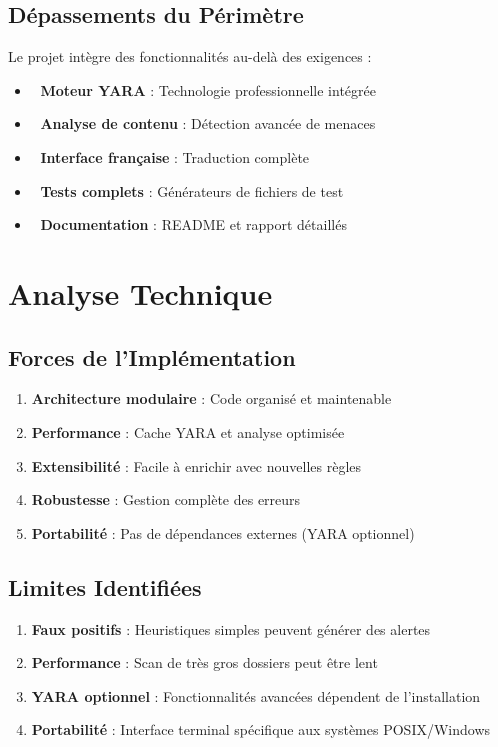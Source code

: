\documentclass[12pt,a4paper]{report}
\begin{document}
\subsection{Dépassements du Périmètre}

Le projet intègre des fonctionnalités au-delà des exigences :

\begin{itemize}
    \item 🌟 \textbf{Moteur YARA} : Technologie professionnelle intégrée
    \item 🌟 \textbf{Analyse de contenu} : Détection avancée de menaces
    \item 🌟 \textbf{Interface française} : Traduction complète
    \item 🌟 \textbf{Tests complets} : Générateurs de fichiers de test
    \item 🌟 \textbf{Documentation} : README et rapport détaillés
\end{itemize}

\section{Analyse Technique}

\subsection{Forces de l'Implémentation}

\begin{enumerate}
    \item \textbf{Architecture modulaire} : Code organisé et maintenable
    \item \textbf{Performance} : Cache YARA et analyse optimisée
    \item \textbf{Extensibilité} : Facile à enrichir avec nouvelles règles
    \item \textbf{Robustesse} : Gestion complète des erreurs
    \item \textbf{Portabilité} : Pas de dépendances externes (YARA optionnel)
\end{enumerate}

\subsection{Limites Identifiées}

\begin{enumerate}
    \item \textbf{Faux positifs} : Heuristiques simples peuvent générer des alertes
    \item \textbf{Performance} : Scan de très gros dossiers peut être lent
    \item \textbf{YARA optionnel} : Fonctionnalités avancées dépendent de l'installation
    \item \textbf{Portabilité} : Interface terminal spécifique aux systèmes POSIX/Windows
\end{enumerate}
\end{document}
